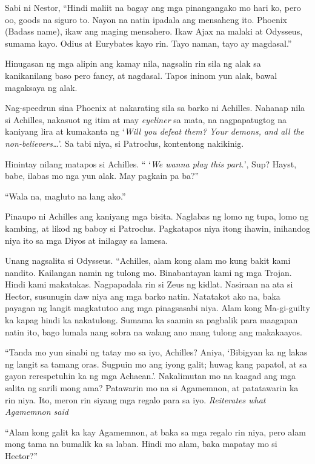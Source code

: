 \documentclass[12pt,letterpaper]{report}
\begin{document}
Sabi ni Nestor, ``Hindi maliit na bagay ang mga pinangangako mo hari ko, pero oo, goods na siguro to. Nayon na natin ipadala ang mensaheng ito. Phoenix (Badass name), ikaw ang maging mensahero. Ikaw Ajax na malaki at Odysseus, sumama kayo. Odius at Eurybates kayo rin. Tayo naman, tayo ay magdasal.''

Hinugasan ng mga alipin ang kamay nila, nagsalin rin sila ng alak sa kanikanilang baso pero fancy, at nagdasal. Tapos ininom yun alak, bawal magaksaya ng alak.

Nag-speedrun sina Phoenix at nakarating sila sa barko ni Achilles. Nahanap nila si Achilles, nakasuot ng itim at may \textit{eyeliner} sa mata, na nagpapatugtog na kaniyang lira at kumakanta ng `\textit{Will you defeat them? Your demons, and all the non-believers\dots}'. Sa tabi niya, si Patroclus, kontentong nakikinig.

Hinintay nilang matapos si Achilles. `` `\textit{We wanna play this part.}', Sup? Hayst, babe, ilabas mo nga yun alak. May pagkain pa ba?''

``Wala na, magluto na lang ako.''

Pinaupo ni Achilles ang kaniyang mga bisita. Naglabas ng lomo ng tupa, lomo ng kambing, at likod ng baboy si Patroclus. Pagkatapos niya itong ihawin, inihandog niya ito sa mga Diyos at inilagay sa lamesa.

Unang nagsalita si Odysseus. ``Achilles, alam kong alam mo kung bakit kami nandito. Kailangan namin ng tulong mo. Binabantayan kami ng mga Trojan. Hindi kami makatakas. Nagpapadala rin si Zeus ng kidlat. Nasiraan na ata si Hector, susunugin daw niya ang mga barko natin. Natatakot ako na, baka payagan ng langit magkatutoo ang mga pinagsasabi niya. Alam kong Ma-gi-guilty ka kapag hindi ka nakatulong. Sumama ka saamin sa pagbalik para maagapan natin ito, bago lumala nang sobra na walang ano mang tulong ang makakaayos.

``Tanda mo yun sinabi ng tatay mo sa iyo, Achilles? Aniya, `Bibigyan ka ng lakas ng langit sa tamang oras. Sugpuin mo ang iyong galit; huwag kang papatol, at sa gayon rerespetuhin ka ng mga Achaean.'. Nakalimutan mo na kaagad ang mga salita ng sarili mong ama? Patawarin mo na si Agamemnon, at patatawarin ka rin niya. Ito, meron rin siyang mga regalo para sa iyo. \textit{Reiterates what Agamemnon said}

``Alam kong galit ka kay Agamemnon, at baka sa mga regalo rin niya, pero alam mong tama na bumalik ka sa laban. Hindi mo alam, baka mapatay mo si Hector?''
\end{document}

